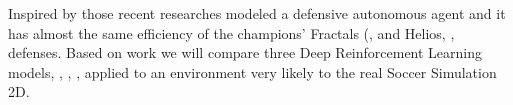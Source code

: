 Inspired by those recent researches \cite{cyrus} modeled a defensive autonomous agent and it has almost the same efficiency of the champions' Fractals (\cite{glidersv2}, and Helios, \cite{helios2016}, defenses. Based on \cite{cyrus} work we will compare three Deep Reinforcement Learning models, \cite{dqn}, \cite{DDQN}, \cite{DDPG}, applied to an environment very likely to the real Soccer Simulation 2D.
